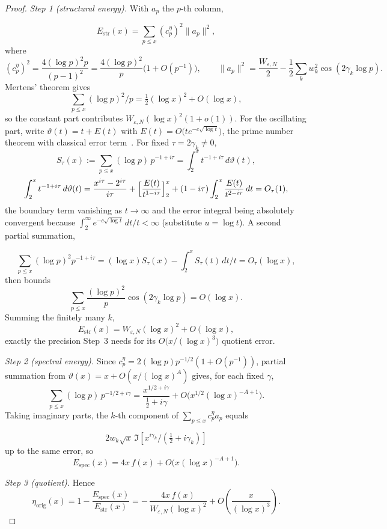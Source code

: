 \documentclass[11pt]{article}
\newcommand{\WeN}{W_{\varepsilon,N}}
\begin{document}
\begin{proof}
\textit{Step 1 (structural energy).} With $a_p$ the $p$-th column,

\[
E_{\mathrm{str}}(x)=\sum_{p\le x}(c_p^{\eta})^2\|a_p\|^2,
\]
 where
\[
(c_p^{\eta})^2=\frac{4(\log p)^2p}{(p-1)^2}
=\frac{4(\log p)^2}{p}\bigl(1+O(p^{-1})\bigr),
\qquad
\|a_p\|^2=\frac{\WeN}{2}-\frac12\sum_kw_k^2\cos(2\gamma_k\log p).
\]
Mertens'
theorem gives 
\[
\sum_{p\le x}(\log p)^2/p=\tfrac12(\log x)^2+O(\log x),
\]
 so the
constant part contributes $\WeN(\log x)^2(1+o(1))$. For the oscillating part, write $\vartheta(t)=t+E(t)$ with
$E(t)=O\bigl(te^{-c\sqrt{\log t}}\bigr)$, the prime number theorem with
classical error term~\cite{IwaniecKowalski}. For fixed
$\tau=2\gamma_k\neq0$,
\[
S_\tau(x):=\sum_{p\le x}(\log p)\,p^{-1+i\tau}
=\int_2^x t^{-1+i\tau}\,d\vartheta(t),
\]
\[
\int_2^x t^{-1+i\tau}\,d\vartheta(t)
=\frac{x^{i\tau}-2^{i\tau}}{i\tau}
+\Bigl[\frac{E(t)}{t^{1-i\tau}}\Bigr]_2^x
+(1-i\tau)\int_2^x\frac{E(t)}{t^{2-i\tau}}\,dt
=O_\tau(1),
\]
the boundary term vanishing as $t\to\infty$ and the error integral being
absolutely convergent because
$\int_2^\infty e^{-c\sqrt{\log t}}\,dt/t<\infty$ (substitute $u=\log t$).
A second partial summation,

\[
\sum_{p\le x}(\log p)^2p^{-1+i\tau}
=(\log x)S_\tau(x)-\int_2^xS_\tau(t)\,dt/t=O_\tau(\log x),
\]
 then bounds
\[
\sum_{p\le x}\frac{(\log p)^2}{p}\cos(2\gamma_k\log p)=O(\log x).
\]
Summing the finitely many $k$,
\[
E_{\mathrm{str}}(x)=\WeN(\log x)^2+O(\log x),
\]
exactly the precision Step~3 needs for its
$O\bigl(x/(\log x)^{3}\bigr)$ quotient error.

\textit{Step 2 (spectral energy).} Since
$c_p^{\eta}=2(\log p)p^{-1/2}(1+O(p^{-1}))$, partial summation from
$\vartheta(x)=x+O(x/(\log x)^{A})$ gives, for each fixed $\gamma$,
\[
\sum_{p\le x}(\log p)\,p^{-1/2+i\gamma}
=\frac{x^{1/2+i\gamma}}{\tfrac12+i\gamma}+O\!\bigl(x^{1/2}(\log x)^{-A+1}\bigr).
\]
Taking imaginary parts, the $k$-th component of
$\sum_{p\le x}c_p^{\eta}a_p$ equals

\[
2w_k\sqrt{x}\,\Im[x^{i\gamma_k}/(\tfrac12+i\gamma_k)]
\]
 up to the same error,
so
\[
E_{\mathrm{spec}}(x)=4x\,f(x)+O\bigl(x(\log x)^{-A+1}\bigr).
\]

\textit{Step 3 (quotient).} Hence
\[
\eta_{\mathrm{orig}}(x)=1-\frac{E_{\mathrm{spec}}(x)}{E_{\mathrm{str}}(x)}
=-\,\frac{4x\,f(x)}{\WeN(\log x)^{2}}
+O\!\left(\frac{x}{(\log x)^{3}}\right).
\]


\end{proof}
\end{document}
